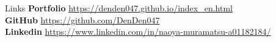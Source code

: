 \documentclass{resume} %
\begin{document}
\begin{rSection}{Links}
    {\bf Portfolio} \hfill {\url{https://denden047.github.io/index_en.html}} \\
    {\bf GitHub} \hfill {\url{https://github.com/DenDen047}} \\
    {\bf Linkedin} \hfill {\url{https://www.linkedin.com/in/naoya-muramatsu-a01182184/}} \\
\end{rSection}
\end{document}
